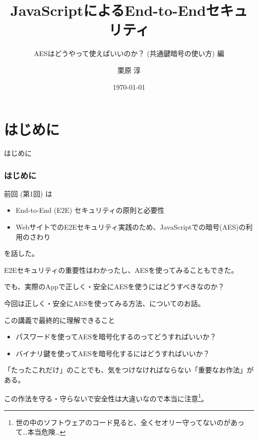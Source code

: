 \documentclass[12pt,dvipdfmx]{beamer}
\title[E2E Security with JS]{JavaScriptによるEnd-to-Endセキュリティ}
\subtitle{AESはどうやって使えばいいのか？ (共通鍵暗号の使い方) 編}
\author[Jun Kurihara]{栗原 淳}
\institute[]{}
\date[\today]{\today}
\begin{document}
\begin{frame}
\titlepage
\end{frame}

\section{はじめに}
\begin{frame}
 \centering
 {\Large はじめに}
\end{frame}

\begin{frame}
\frametitle{はじめに}
前回 (第1回) は
\begin{itemize}
 \item End-to-End (E2E) セキュリティの原則と必要性
 \item WebサイトでのE2Eセキュリティ実践のため、JavaScriptでの暗号(AES)の利用のさわり
\end{itemize}
を話した。

\vspace{2ex}

E2Eセキュリティの重要性はわかったし、AESを使ってみることもできた。

\vspace{2ex}

でも、実際のAppで\alert{正しく・安全にAESを使うにはどうすべきなのか？}
\end{frame}

\begin{frame}
今回は正しく・安全にAESを使ってみる方法、についてのお話。

\begin{block}{\small この講義で最終的に理解できること}
\begin{itemize}
\item パスワードを使ってAESを暗号化するのってどうすればいいか？
\item バイナリ鍵を使ってAESを暗号化するにはどうすればいいか？
\end{itemize}
 
\end{block}

「たったこれだけ」のことでも、気をつけなければならない\alert{「重要なお作法」}がある。

\alert{この作法を守る・守らないで安全性は大違い}なので本当に注意\footnote[frame]{世の中のソフトウェアのコード見ると、全くセオリー守ってないのがあって…本当危険…}。

\end{frame}
\end{document}
